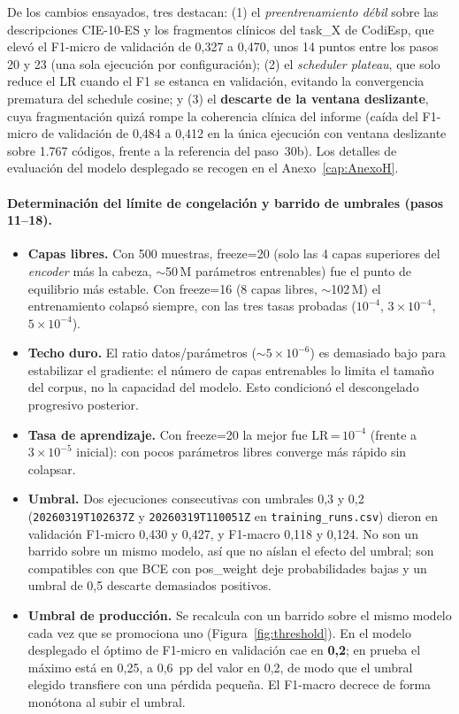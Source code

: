 De los cambios ensayados, tres destacan: (1) el \emph{preentrenamiento débil} sobre las descripciones CIE-10-ES y los fragmentos clínicos del task\_X de CodiEsp, que elevó el F1-micro de validación de 0,327 a 0,470, unos 14 puntos entre los pasos 20 y 23 (una sola ejecución por configuración); (2) el \emph{scheduler plateau}, que solo reduce el LR cuando el F1 se estanca en validación, evitando la convergencia prematura del schedule cosine; y (3) el \textbf{descarte de la ventana deslizante}, cuya fragmentación quizá rompe la coherencia clínica del informe (caída del F1-micro de validación de 0,484 a 0,412 en la única ejecución con ventana deslizante sobre 1.767 códigos, frente a la referencia del paso~30b). Los detalles de evaluación del modelo desplegado se recogen en el Anexo~\ref{cap:AnexoH}.

\paragraph{Determinación del límite de congelación y barrido de umbrales (pasos 11--18).}
\begin{itemize}
 \item \textbf{Capas libres.} Con 500 muestras, freeze=20 (solo las 4 capas superiores del \emph{encoder} más la cabeza, $\sim$50\,M parámetros entrenables) fue el punto de equilibrio más estable. Con freeze=16 (8 capas libres, $\sim$102\,M) el entrenamiento colapsó siempre, con las tres tasas probadas ($10^{-4}$, $3\times10^{-4}$, $5\times10^{-4}$).
 \item \textbf{Techo duro.} El ratio datos/parámetros ($\sim$$5\times10^{-6}$) es demasiado bajo para estabilizar el gradiente: el número de capas entrenables lo limita el tamaño del corpus, no la capacidad del modelo. Esto condicionó el descongelado progresivo posterior.
 \item \textbf{Tasa de aprendizaje.} Con freeze=20 la mejor fue LR\,=\,$10^{-4}$ (frente a $3\times10^{-5}$ inicial): con pocos parámetros libres converge más rápido sin colapsar.
 \item \textbf{Umbral.} Dos ejecuciones consecutivas con umbrales 0,3 y 0,2 (\texttt{20260319T102637Z} y \texttt{20260319T110051Z} en \texttt{training\_runs.csv}) dieron en validación F1-micro 0,430 y 0,427, y F1-macro 0,118 y 0,124. No son un barrido sobre un mismo modelo, así que no aíslan el efecto del umbral; son compatibles con que BCE con pos\_weight deje probabilidades bajas y un umbral de 0,5 descarte demasiados positivos.
 \item \textbf{Umbral de producción.} Se recalcula con un barrido sobre el mismo modelo cada vez que se promociona uno (Figura~\ref{fig:threshold}). En el modelo desplegado el óptimo de F1-micro en validación cae en \textbf{0,2}; en prueba el máximo está en 0,25, a 0,6~pp del valor en 0,2, de modo que el umbral elegido transfiere con una pérdida pequeña. El F1-macro decrece de forma monótona al subir el umbral.
\end{itemize}

